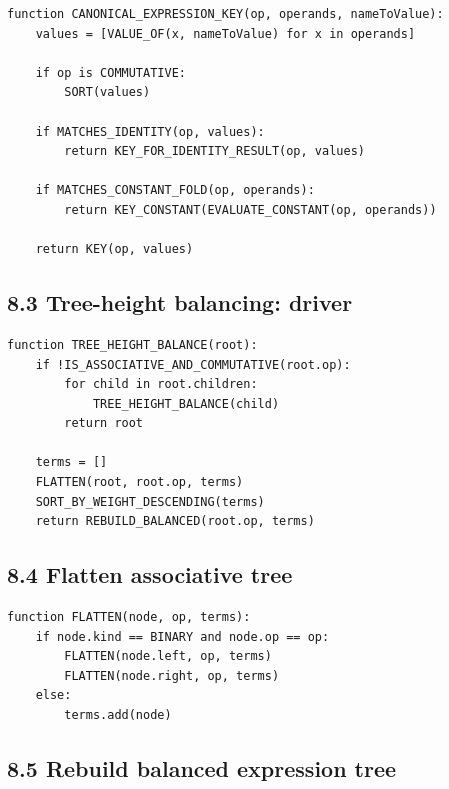 \documentclass[10pt,letterpaper]{article}
\begin{document}
\begin{verbatim}
function CANONICAL_EXPRESSION_KEY(op, operands, nameToValue):
    values = [VALUE_OF(x, nameToValue) for x in operands]

    if op is COMMUTATIVE:
        SORT(values)

    if MATCHES_IDENTITY(op, values):
        return KEY_FOR_IDENTITY_RESULT(op, values)

    if MATCHES_CONSTANT_FOLD(op, operands):
        return KEY_CONSTANT(EVALUATE_CONSTANT(op, operands))

    return KEY(op, values)
\end{verbatim}

\subsection*{8.3 Tree-height balancing: driver}
{}

\begin{verbatim}
function TREE_HEIGHT_BALANCE(root):
    if !IS_ASSOCIATIVE_AND_COMMUTATIVE(root.op):
        for child in root.children:
            TREE_HEIGHT_BALANCE(child)
        return root

    terms = []
    FLATTEN(root, root.op, terms)
    SORT_BY_WEIGHT_DESCENDING(terms)
    return REBUILD_BALANCED(root.op, terms)
\end{verbatim}

\subsection*{8.4 Flatten associative tree}
{}

\begin{verbatim}
function FLATTEN(node, op, terms):
    if node.kind == BINARY and node.op == op:
        FLATTEN(node.left, op, terms)
        FLATTEN(node.right, op, terms)
    else:
        terms.add(node)
\end{verbatim}

\subsection*{8.5 Rebuild balanced expression tree}
{}
\end{document}
